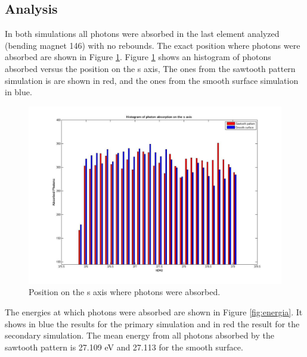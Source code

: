 \subsection{Analysis}
In both simulations all photons were absorbed in the last element analyzed (bending magnet 146) with no rebounds. The exact position where photons were absorbed are shown in Figure \ref{fig:s}. Figure \ref{fig:s} shows an histogram of photons absorbed versus the position on the s axis, The ones from the sawtooth pattern simulation is are shown in red, and the ones from the smooth surface simulation in blue.
\begin{figure}%
  	\centering
   	\includegraphics[width=6.5in, height=.65\textheight]{Graficas/nuevas/sbarras.jpg}
  		\caption{\label{fig:s}
   			Position on the s axis where photons were absorbed.}
 \end{figure}


The energies at which photons were absorbed are shown in Figure \ref{fig:energia}. It shows in blue the results for the primary simulation and in red the result for the secondary simulation. The mean energy from all photons absorbed by the sawtooth pattern is 27.109 eV and 27.113 for the smooth surface.  

